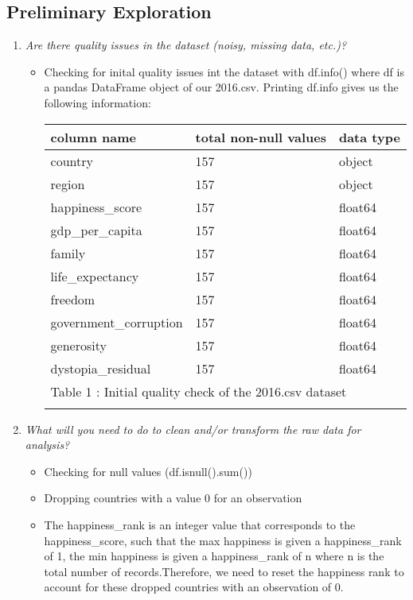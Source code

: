\documentclass{article}%
\begin{document}
\subsection{Preliminary Exploration}%
\label{subsec:PreliminaryExploration}%
\begin{enumerate}%
\item%
\textit{Are there quality issues in the dataset (noisy, missing data, etc.)?}%
\begin{itemize}%
\item%
Checking for inital quality issues int the dataset with df.info() where df is a pandas DataFrame object of our 2016.csv. Printing df.info gives us the following information:%
\begin{longtable}{l l l}%
\hline%
column name&total non{-}null values&data type\\%
\hline%
\endhead%
\hline%
country&157&object\\%
region&157&object\\%
happiness\_score&157&float64\\%
gdp\_per\_capita&157&float64\\%
family&157&float64\\%
life\_expectancy&157&float64\\%
freedom&157&float64\\%
government\_corruption&157&float64\\%
generosity&157&float64\\%
dystopia\_residual&157&float64\\%
\hline%
\multicolumn{3}{l}{Table 1 : Initial quality check of the 2016.csv dataset}\\%
\endlastfoot%
\end{longtable}%
\end{itemize}%
\item%
\textit{What will you need to do to clean and/or transform the raw data for analysis?}%
\begin{itemize}%
\item%
Checking for null values (df.isnull().sum())%
\item%
Dropping countries with a value 0 for an observation%
\item%
The happiness\_rank is an integer value that corresponds to the happiness\_score, such that the max happiness is given a happiness\_rank of 1, the min happiness is given a happiness\_rank of n where n is the total number of records.Therefore, we need to reset the happiness rank to account for these dropped countries with an observation of 0.%

\end{itemize}
\end{enumerate}
\end{document}
